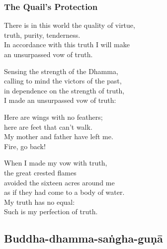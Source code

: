 
\subsubsection{The Quail's Protection}

There is in this world the quality of virtue,\\
truth, purity, tenderness.\\
In accordance with this truth I will make\\
an unsurpassed vow of truth.

Sensing the strength of the Dhamma,\\
calling to mind the victors of the past,\\
in dependence on the strength of truth,\\
I made an unsurpassed vow of truth:

Here are wings with no feathers;\\
here are feet that can't walk.\\
My mother and father have left me.\\
Fire, go back!

When I made my vow with truth,\\
the great crested flames\\
avoided the sixteen acres around me\\
as if they had come to a body of water.\\
My truth has no equal:\\
Such is my perfection of truth.

\subsection{Buddha-dhamma-saṅgha-guṇā}
\label{iti-pi-so}


